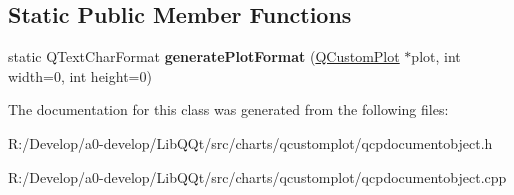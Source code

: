 \subsection*{Static Public Member Functions}
\begin{DoxyCompactItemize}
\item 
\mbox{\label{class_q_c_p_document_object_ad0c0a875695264f241c54747de3be3df}} 
static Q\+Text\+Char\+Format {\bfseries generate\+Plot\+Format} (\mbox{\hyperlink{class_q_custom_plot}{Q\+Custom\+Plot}} $\ast$plot, int width=0, int height=0)
\end{DoxyCompactItemize}


The documentation for this class was generated from the following files\+:\begin{DoxyCompactItemize}
\item 
R\+:/\+Develop/a0-\/develop/\+Lib\+Q\+Qt/src/charts/qcustomplot/qcpdocumentobject.\+h\item 
R\+:/\+Develop/a0-\/develop/\+Lib\+Q\+Qt/src/charts/qcustomplot/qcpdocumentobject.\+cpp\end{DoxyCompactItemize}
